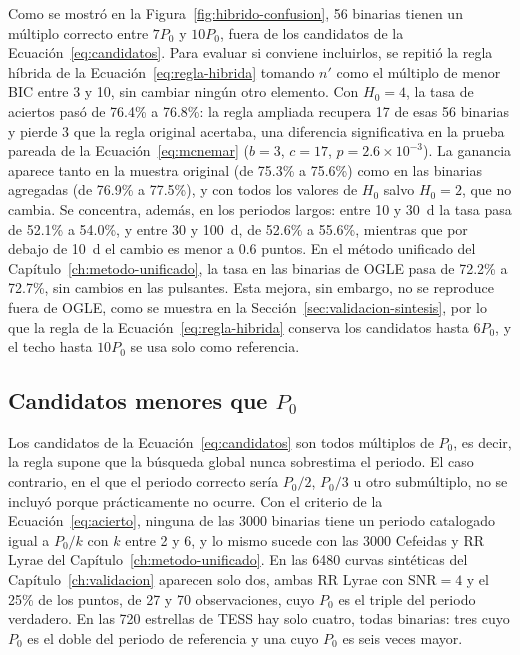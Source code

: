 \documentclass[12pt,letterpaper,oneside]{book}
\begin{document}
Como se mostr\'o en la Figura~\ref{fig:hibrido-confusion}, 56 binarias tienen un m\'ultiplo correcto entre $7P_0$ y $10P_0$, fuera de los candidatos de la Ecuaci\'on~\eqref{eq:candidatos}. Para evaluar si conviene incluirlos, se repiti\'o la regla h\'ibrida de la Ecuaci\'on~\eqref{eq:regla-hibrida} tomando $n'$ como el m\'ultiplo de menor BIC entre 3 y 10, sin cambiar ning\'un otro elemento. Con $H_0=4$, la tasa de aciertos pas\'o de 76.4\% a 76.8\%: la regla ampliada recupera 17 de esas 56 binarias y pierde 3 que la regla original acertaba, una diferencia significativa en la prueba pareada de la Ecuaci\'on~\eqref{eq:mcnemar} ($b=3$, $c=17$, $p=2.6\times10^{-3}$). La ganancia aparece tanto en la muestra original (de 75.3\% a 75.6\%) como en las binarias agregadas (de 76.9\% a 77.5\%), y con todos los valores de $H_0$ salvo $H_0=2$, que no cambia. Se concentra, adem\'as, en los periodos largos: entre 10 y 30~d la tasa pasa de 52.1\% a 54.0\%, y entre 30 y 100~d, de 52.6\% a 55.6\%, mientras que por debajo de 10~d el cambio es menor a 0.6 puntos. En el m\'etodo unificado del Cap\'itulo~\ref{ch:metodo-unificado}, la tasa en las binarias de OGLE pasa de 72.2\% a 72.7\%, sin cambios en las pulsantes. Esta mejora, sin embargo, no se reproduce fuera de OGLE, como se muestra en la Secci\'on~\ref{sec:validacion-sintesis}, por lo que la regla de la Ecuaci\'on~\eqref{eq:regla-hibrida} conserva los candidatos hasta $6P_0$, y el techo hasta $10P_0$ se usa solo como referencia.

\subsection{Candidatos menores que $P_0$}
\label{sec:hibrido-submultiplos}

Los candidatos de la Ecuaci\'on~\eqref{eq:candidatos} son todos m\'ultiplos de $P_0$, es decir, la regla supone que la b\'usqueda global nunca sobrestima el periodo. El caso contrario, en el que el periodo correcto ser\'ia $P_0/2$, $P_0/3$ u otro subm\'ultiplo, no se incluy\'o porque pr\'acticamente no ocurre. Con el criterio de la Ecuaci\'on~\eqref{eq:acierto}, ninguna de las 3000 binarias tiene un periodo catalogado igual a $P_0/k$ con $k$ entre 2 y 6, y lo mismo sucede con las 3000 Cefeidas y RR Lyrae del Cap\'itulo~\ref{ch:metodo-unificado}. En las 6480 curvas sint\'eticas del Cap\'itulo~\ref{ch:validacion} aparecen solo dos, ambas RR Lyrae con $\mathrm{SNR}=4$ y el 25\% de los puntos, de 27 y 70 observaciones, cuyo $P_0$ es el triple del periodo verdadero. En las 720 estrellas de TESS hay solo cuatro, todas binarias: tres cuyo $P_0$ es el doble del periodo de referencia y una cuyo $P_0$ es seis veces mayor.
\end{document}

